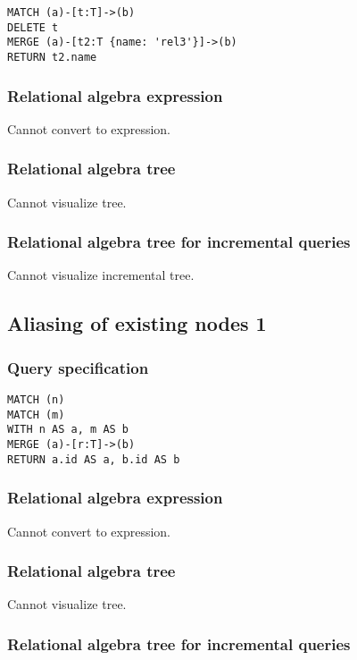 \begin{lstlisting}
MATCH (a)-[t:T]->(b)
DELETE t
MERGE (a)-[t2:T {name: 'rel3'}]->(b)
RETURN t2.name
\end{lstlisting}

\subsubsection*{Relational algebra expression}

Cannot convert to expression.

\subsubsection*{Relational algebra tree}

Cannot visualize tree.

\subsubsection*{Relational algebra tree for incremental queries}

Cannot visualize incremental tree.

\subsection{Aliasing of existing nodes 1}

\subsubsection*{Query specification}

\begin{lstlisting}
MATCH (n)
MATCH (m)
WITH n AS a, m AS b
MERGE (a)-[r:T]->(b)
RETURN a.id AS a, b.id AS b
\end{lstlisting}

\subsubsection*{Relational algebra expression}

Cannot convert to expression.

\subsubsection*{Relational algebra tree}

Cannot visualize tree.

\subsubsection*{Relational algebra tree for incremental queries}

